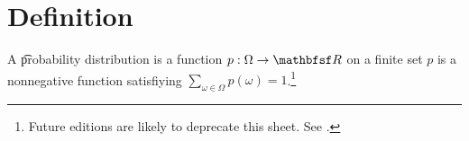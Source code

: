 
\section*{Definition}

A \t{probability distribution} is a function $p: \Omega  \to \R $ on a finite set $p$ is a nonnegative function satisfiying $\sum_{\omega  \in \Omega } p(\omega ) = 1$.\footnote{Future editions are likely to deprecate this sheet.
See .}

\blankpage